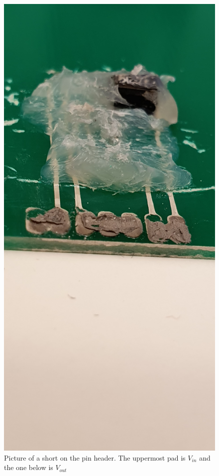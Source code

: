 \begin{figure}[h!]
    \includegraphics[width=\linewidth]{ela302-kortslutning.jpg}
    \caption{Picture of a short on the pin header. The uppermost pad is $V_{in}$ and the one below is $V_{out}$}
    \label{fig:short}
\end{figure}
